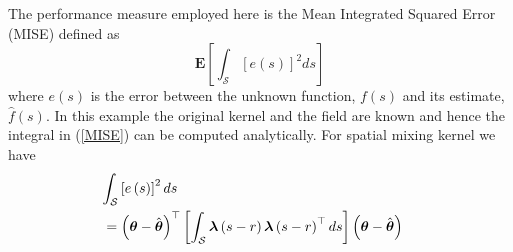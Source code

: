 \documentclass[draftcls,onecolumn]{IEEEtran}
\begin{document}
 The performance measure employed here is the Mean Integrated Squared Error (MISE) defined as
\begin{equation}
 \mathbf{E}\left[\int_{\mathcal{S}}\left[e\left(s\right) \right]^2ds  \right]
\label{MISE} 
\end{equation}
 where  $e\left(s\right)$ is the error between the unknown function, $f\left( s\right) $ and its estimate, $\hat{f}\left( s\right) $. In this example the original kernel and the field are known and hence the integral in  (\ref{MISE}) can be computed analytically. For spatial mixing kernel we have
\begin{eqnarray}
 \lefteqn{\int_{\mathcal{S}}\left[e\left(s\right)\right]^2ds}\nonumber \\  &=\left(\boldsymbol{\theta}-\hat{\boldsymbol{\theta}}\right)^\top\left[ \int_{\mathcal{S}}\boldsymbol\lambda\left(s-r\right)\boldsymbol\lambda\left(s-r\right)^\top ds\right] \left(\boldsymbol{\theta}-\hat{\boldsymbol{\theta}}\right)&
\label{MISEKernel}
\end{eqnarray}
\end{document}

